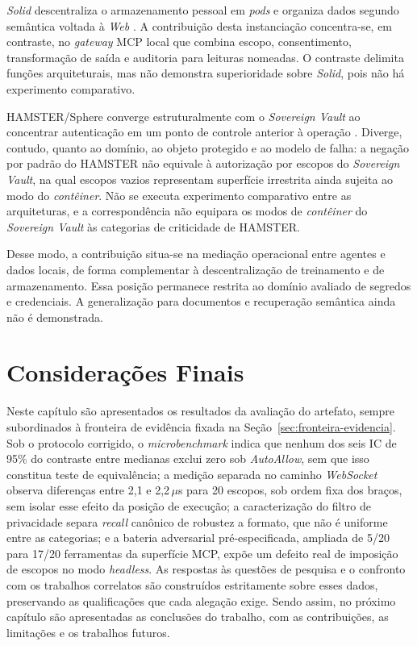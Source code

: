 \documentclass[12pt,openright,twoside,a4paper,english,brazil]{abntex2}
\newcommand{\micro}{\,$\mu$s}
\begin{document}
\textit{Solid} descentraliza o armazenamento pessoal em \textit{pods} e organiza dados segundo semântica voltada à \textit{Web} \cite{sambra2016}. A contribuição desta instanciação concentra-se, em contraste, no \textit{gateway} MCP local que combina escopo, consentimento, transformação de saída e auditoria para leituras nomeadas. O contraste delimita funções arquiteturais, mas não demonstra superioridade sobre \textit{Solid}, pois não há experimento comparativo.

HAMSTER/Sphere converge estruturalmente com o \textit{Sovereign Vault} ao concentrar autenticação em um ponto de controle anterior à operação \cite{pigatto2016}. Diverge, contudo, quanto ao domínio, ao objeto protegido e ao modelo de falha: a negação por padrão do HAMSTER não equivale à autorização por escopos do \textit{Sovereign Vault}, na qual escopos vazios representam superfície irrestrita ainda sujeita ao modo do \textit{contêiner}. Não se executa experimento comparativo entre as arquiteturas, e a correspondência não equipara os modos de \textit{contêiner} do \textit{Sovereign Vault} às categorias de criticidade de HAMSTER.

Desse modo, a contribuição situa-se na mediação operacional entre agentes e dados locais, de forma complementar à descentralização de treinamento e de armazenamento. Essa posição permanece restrita ao domínio avaliado de segredos e credenciais. A generalização para documentos e recuperação semântica ainda não é demonstrada.

\section{Considerações Finais}

Neste capítulo são apresentados os resultados da avaliação do artefato, sempre subordinados à fronteira de evidência fixada na Seção~\ref{sec:fronteira-evidencia}. Sob o protocolo corrigido, o \textit{microbenchmark} indica que nenhum dos seis IC de 95\% do contraste entre medianas exclui zero sob \textit{AutoAllow}, sem que isso constitua teste de equivalência; a medição separada no caminho \textit{WebSocket} observa diferenças entre 2,1 e 2,2\micro{} para 20 escopos, sob ordem fixa dos braços, sem isolar esse efeito da posição de execução; a caracterização do filtro de privacidade separa \textit{recall} canônico de robustez a formato, que não é uniforme entre as categorias; e a bateria adversarial pré-especificada, ampliada de 5/20 para 17/20 ferramentas da superfície MCP, expõe um defeito real de imposição de escopos no modo \textit{headless}. As respostas às questões de pesquisa e o confronto com os trabalhos correlatos são construídos estritamente sobre esses dados, preservando as qualificações que cada alegação exige. Sendo assim, no próximo capítulo são apresentadas as conclusões do trabalho, com as contribuições, as limitações e os trabalhos futuros.
\end{document}
